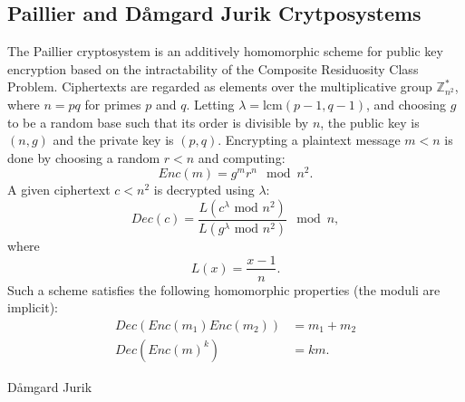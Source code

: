 \subsection{Paillier and D\aa mgard Jurik Crytposystems}

The Paillier cryptosystem \cite{Paillier} is an additively homomorphic
scheme for public key encryption based on the intractability of the
Composite Residuosity Class Problem. Ciphertexts are regarded as elements
over the multiplicative group $\mathbb{Z}_{n^{2}}^{*}$, where $n=pq$
for primes $p$ and $q$. Letting $\lambda=\text{lcm}(p-1,q-1)$,
and choosing $g$ to be a random base such that its order is divisible
by $n$, the public key is $(n,g)$ and the private key is $(p,q)$.
Encrypting a plaintext message $m<n$ is done by choosing a random
$r<n$ and computing: 
\[
Enc(m)=g^{m}r^{n}\mod n^{2}.
\]
A given ciphertext $c<n^{2}$ is decrypted using $\lambda$: 
\[
Dec(c)=\frac{L(c^{\lambda}\text{ mod }n^{2})}{L(g^{\lambda}\text{ mod }n^{2})}\mod n,
\]
where 
\[
L(x)=\frac{x-1}{n}.
\]
Such a scheme satisfies the following homomorphic properties (the
moduli are implicit): 
\begin{align*}
Dec(Enc(m_{1})Enc(m_{2})) & =m_{1}+m_{2}\\
Dec(Enc(m)^{k}) & =km.
\end{align*}

D\aa mgard Jurik \cite{Damgard} 
